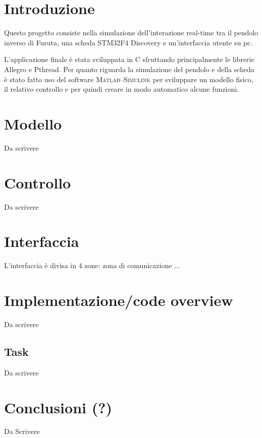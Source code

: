 \section{Introduzione}
Questo progetto consiste nella simulazione dell'interazione real-time tra il pendolo inverso di Furuta, una scheda STM32F4 Discovery e un'interfaccia utente su pc. 

L'applicazione finale \`e stata sviluppata in C sfruttando principalmente le librerie Allegro e Pthread. Per quanto riguarda la simulazione del pendolo e della scheda \`e stato fatto uso del software \textsc{Matlab--Simulink} per sviluppare un modello fisico, il relativo controllo e per quindi creare in modo automatico alcune funzioni.


\section{Modello}
Da scrivere

\section{Controllo}
Da scrivere

\section{Interfaccia}
L'interfaccia \`e divisa in 4 zone: zona di comunicazione ...



\section{Implementazione/code overview}
Da scrivere
\subsection{Task}
Da scrivere

\section{Conclusioni (?)}
Da Scrivere

	
